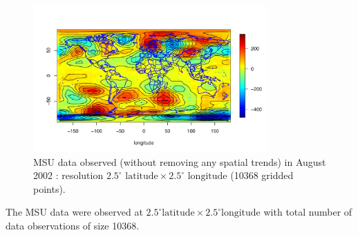 
\begin{figure}[H]
\label{MSU_data}
\centering
\includegraphics [width=0.8\textwidth, keepaspectratio]{graphs/MSU_data.pdf}
\caption{MSU data observed (without removing any spatial trends) in August 2002 : resolution $2.5^\circ \mbox{ latitude} \times 2.5^\circ \mbox{ longitude}$ (10368 gridded points).}
\end{figure}
\vfill
 The MSU data were observed at $2.5^\circ \mbox{latitude} \times 2.5^\circ \mbox{longitude}$ with total number of data observations of size 10368.



